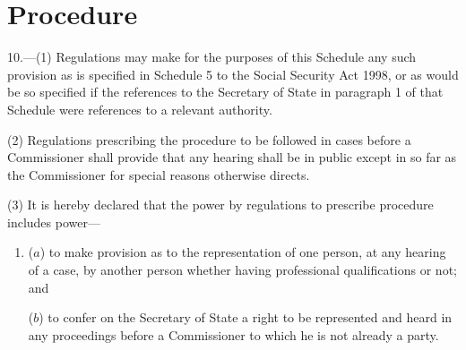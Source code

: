 \documentclass[12pt,a4paper]{article}
\begin{document}
%
%


\section*{Procedure}

10.---(1) Regulations may make for the purposes of this Schedule any such provision as is specified in Schedule 5 to the Social Security Act 1998, or as would be so specified if the references to the Secretary of State in paragraph 1 of that Schedule were references to a relevant authority.

(2) Regulations prescribing the procedure to be followed in cases before a Commissioner shall provide that any hearing shall be in public except in so far as the Commissioner for special reasons otherwise directs.

(3) It is hereby declared that the power by regulations to prescribe procedure includes power—
\begin{enumerate}\item[]
($a$) to make provision as to the representation of one person, at any hearing of a case, by another person whether having professional qualifications or not; and

($b$) to confer on the Secretary of State a right to be represented and heard in any proceedings before a Commissioner to which he is not already a party.
\end{enumerate}


%
%
%
\end{document}
